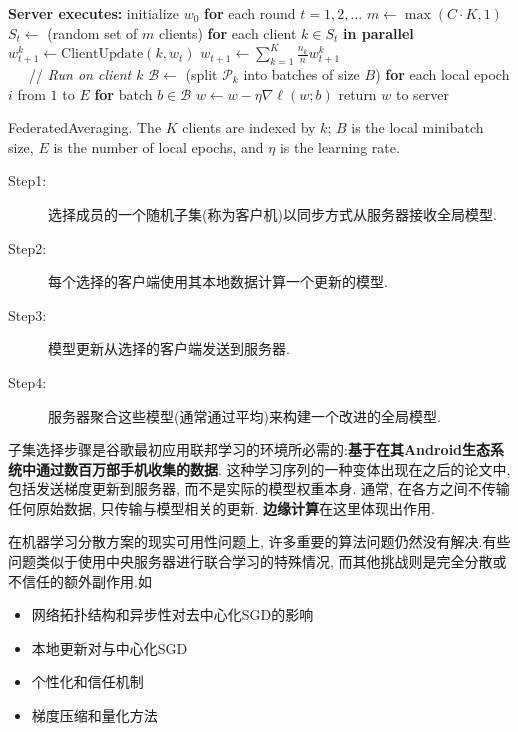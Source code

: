 \documentclass[a4paper]{article}
\newcommand{\FOR}{ \State \textbf{for }}
\newcommand{\lbs}{\ensuremath{B}}
\newcommand{\lepochs}{\ensuremath{E}}
\theoremstyle{definition}
\numberwithin{equation}{section}
\begin{document}
   \begin{algorithm}[t]
    \begin{algorithmic}
    \State \textbf{Server executes:}
       \State initialize $w_0$
       \FOR{each round $t = 1,  2,  \dots$} 
       \hspace{1em} \State $m \leftarrow \max( C\cdot K,  1)$
          \State $S_t \leftarrow$ (random set of $m$ clients)
           \FOR{each client $k \in S_t$ \textbf{in parallel}}
            \State $w_{t+1}^k \leftarrow \text{ClientUpdate}(k,  w_t)$ 
           \State $w_{t+1} \leftarrow \sum_{k=1}^K \frac{n_k}{n} w_{t+1}^k$ \\

     \ \ \  // \emph{Run on client $k$}
      \State $\mathcal{B} \leftarrow$ (split $\mathcal{P}_k$ into batches of size $\lbs$)
       \FOR{each local epoch $i$ from $1$ to $ \lepochs$}
      \FOR{batch $b \in \mathcal{B}$}
         \State $w \leftarrow w - \eta \nabla \ell(w; b)$
       \State return $w$ to server
    \end{algorithmic}
    \caption{FederatedAveraging. The $K$
      clients are indexed by $k$; $\lbs$ is the local minibatch size, 
      $\lepochs$ is the number of local epochs,  and $\eta$ is the learning
      rate.} 
    \label{alg:fedavg}
    \end{algorithm}
     
    \begin{description}
        \item[Step1:] 选择成员的一个随机子集(称为客户机)以同步方式从服务器接收全局模型. 
        \item[Step2:] 每个选择的客户端使用其本地数据计算一个更新的模型. 
        \item[Step3:] 模型更新从选择的客户端发送到服务器.  
        \item[Step4:] 服务器聚合这些模型(通常通过平均)来构建一个改进的全局模型.  
    \end{description}

子集选择步骤是谷歌最初应用联邦学习的环境所必需的:\textbf{基于在其Android生态系统中通过数百万部手机收集的数据}. 这种学习序列的一种变体出现在之后的论文中, 包括发送梯度更新到服务器, 而不是实际的模型权重本身. 通常, 在各方之间不传输任何原始数据, 只传输与模型相关的更新. \textbf{边缘计算}在这里体现出作用. 
 
在机器学习分散方案的现实可用性问题上, 许多重要的算法问题仍然没有解决.有些问题类似于使用中央服务器进行联合学习的特殊情况, 而其他挑战则是完全分散或不信任的额外副作用.如
\begin{itemize}
    
\item 网络拓扑结构和异步性对去中心化SGD的影响
\item 本地更新对与中心化SGD
\item 个性化和信任机制
\item 梯度压缩和量化方法
\end{itemize}
\end{document}
